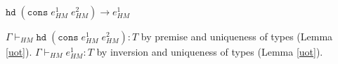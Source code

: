 \begin{case}
$\mathtt{hd}\;(\mathtt{cons}\;e_{HM}^{1}\;e_{HM}^{2})\rightarrow e_{HM}^{1}$

$\Gamma\vdash_{HM}\mathtt{hd}\;(\mathtt{cons}\;e_{HM}^{1}\;e_{HM}^{2}):T$ by premise and uniqueness of types (Lemma \ref{uot}).  $\Gamma\vdash_{HM}e_{HM}^{1}:T$ by inversion and uniqueness of types (Lemma \ref{uot}).
\end{case}